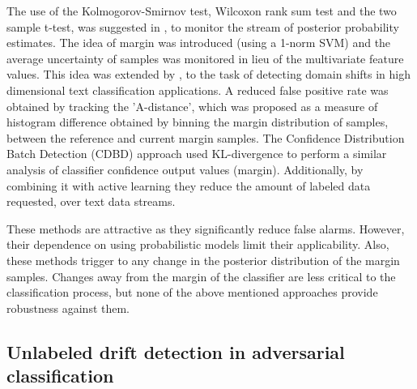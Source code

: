 \documentclass[authoryear,3p,times,twocolumn]{elsarticle}
\begin{document}
The use of the Kolmogorov-Smirnov test, Wilcoxon rank sum test and the two sample t-test, was suggested in  \citep{dries2009adaptive}, to monitor the stream of posterior probability estimates. The idea of margin was introduced (using a 1-norm SVM) and the average uncertainty of samples was monitored in lieu of the multivariate feature values. This idea was extended by \citep{dredze2010we}, to the task of detecting domain shifts in high dimensional text classification applications. A reduced false positive rate was obtained by tracking the 'A-distance', which was proposed as a measure of histogram difference obtained by binning the margin distribution of samples, between the reference and current margin samples. The Confidence Distribution Batch Detection (CDBD) approach \citep{lindstrom2013drift} used KL-divergence to perform a similar analysis of classifier confidence output values (margin). Additionally, by combining it with active learning they reduce the amount of labeled data requested, over text data streams. 

These methods are attractive as they significantly reduce false alarms. However, their dependence on using probabilistic models limit their applicability. Also, these methods trigger to any change in the posterior distribution of the margin samples. Changes away from the margin of the classifier are less critical to the classification process, but none of the above mentioned approaches provide robustness against them. 

\subsection{Unlabeled drift detection in adversarial classification}
\label{sec:adversarial}
\end{document}
